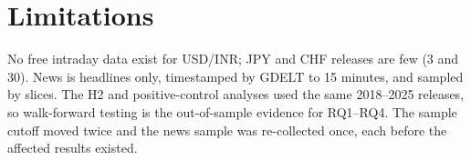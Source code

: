 \documentclass[11pt]{article}
\begin{document}
\section{Limitations}
No free intraday data exist for USD/INR; JPY and CHF releases are few (3 and 30). News is
headlines only, timestamped by GDELT to 15 minutes, and sampled by slices. The H2 and
positive-control analyses used the same 2018--2025 releases, so walk-forward testing is the
out-of-sample evidence for RQ1--RQ4. The sample cutoff moved twice and the news sample was
re-collected once, each before the affected results existed.




\clearpage
\appendix

\end{document}
